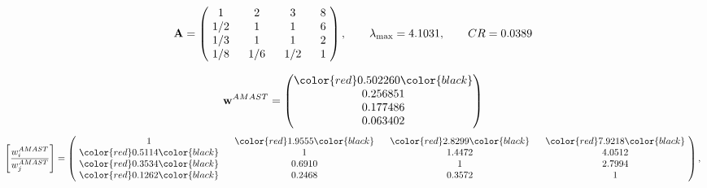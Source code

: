 \begin{example}
\begin{equation*}
\mathbf{A} =
\begin{pmatrix}
$\,\,$ 1 $\,\,$ & $\,\,$2$\,\,$ & $\,\,$3$\,\,$ & $\,\,$8 $\,\,$ \\
$\,\,$ 1/2$\,\,$ & $\,\,$ 1 $\,\,$ & $\,\,$1$\,\,$ & $\,\,$6 $\,\,$ \\
$\,\,$ 1/3$\,\,$ & $\,\,$ 1 $\,\,$ & $\,\,$ 1 $\,\,$ & $\,\,$2 $\,\,$ \\
$\,\,$ 1/8$\,\,$ & $\,\,$ 1/6$\,\,$ & $\,\,$ 1/2$\,\,$ & $\,\,$ 1  $\,\,$ \\
\end{pmatrix},
\qquad
\lambda_{\max} =
4.1031,
\qquad
CR = 0.0389
\end{equation*}

\begin{equation*}
\mathbf{w}^{AMAST} =
\begin{pmatrix}
\color{red} 0.502260\color{black} \\
0.256851\\
0.177486\\
0.063402
\end{pmatrix}\end{equation*}
\begin{equation*}
\left[ \frac{{w}^{AMAST}_i}{{w}^{AMAST}_j} \right] =
\begin{pmatrix}
$\,\,$ 1 $\,\,$ & $\,\,$\color{red} 1.9555\color{black} $\,\,$ & $\,\,$\color{red} 2.8299\color{black} $\,\,$ & $\,\,$\color{red} 7.9218\color{black} $\,\,$ \\
$\,\,$\color{red} 0.5114\color{black} $\,\,$ & $\,\,$ 1 $\,\,$ & $\,\,$1.4472$\,\,$ & $\,\,$4.0512  $\,\,$ \\
$\,\,$\color{red} 0.3534\color{black} $\,\,$ & $\,\,$0.6910$\,\,$ & $\,\,$ 1 $\,\,$ & $\,\,$2.7994 $\,\,$ \\
$\,\,$\color{red} 0.1262\color{black} $\,\,$ & $\,\,$0.2468$\,\,$ & $\,\,$0.3572$\,\,$ & $\,\,$ 1  $\,\,$ \\
\end{pmatrix},
\end{equation*}


\end{example}
